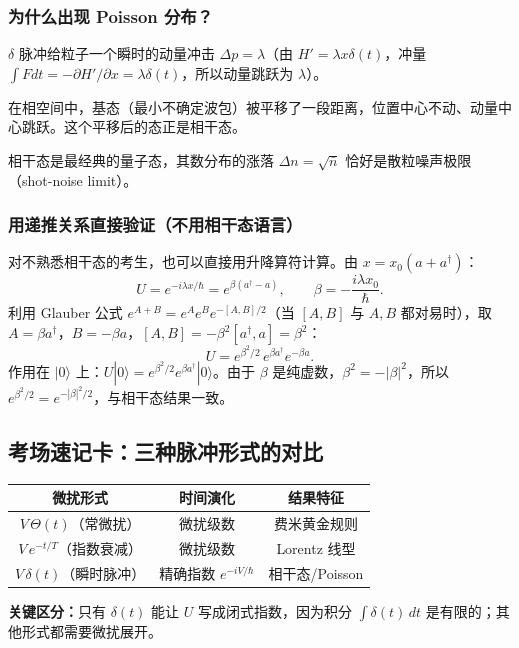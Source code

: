 \subsubsection{为什么出现 Poisson 分布？}

\begin{insightbox}
$\delta$ 脉冲给粒子一个瞬时的动量冲击 $\Delta p = \lambda$（由 $H' = \lambda x\delta(t)$，冲量 $\int F dt = -\partial H'/\partial x = \lambda\delta(t)$，所以动量跳跃为 $\lambda$）。

在相空间中，基态（最小不确定波包）被平移了一段距离，位置中心不动、动量中心跳跃。这个平移后的态正是相干态。

相干态是最经典的量子态，其数分布的涨落 $\Delta n = \sqrt{\bar{n}}$ 恰好是散粒噪声极限（shot-noise limit）。
\end{insightbox}

\subsubsection{用递推关系直接验证（不用相干态语言）}

\begin{derivationbox}[用递推关系直接验证]
对不熟悉相干态的考生，也可以直接用升降算符计算。由 $x = x_0(a + a^\dagger)$：
\[
U = e^{-i\lambda x/\hbar} = e^{\beta(a^\dagger - a)}, \qquad \beta = -\frac{i\lambda x_0}{\hbar}.
\]
利用 Glauber 公式 $e^{A+B} = e^A e^B e^{-[A,B]/2}$（当 $[A,B]$ 与 $A,B$ 都对易时），取 $A = \beta a^\dagger$，$B = -\beta a$，$[A,B] = -\beta^2[a^\dagger, a] = \beta^2$：
\[
U = e^{\beta^2/2} \, e^{\beta a^\dagger} e^{-\beta a}.
\]
作用在 $|0\rangle$ 上：$U|0\rangle = e^{\beta^2/2} e^{\beta a^\dagger} |0\rangle$。由于 $\beta$ 是纯虚数，$\beta^2 = -|\beta|^2$，所以 $e^{\beta^2/2} = e^{-|\beta|^2/2}$，与相干态结果一致。
\end{derivationbox}

\subsection{考场速记卡：三种脉冲形式的对比}

\begin{cheatbox}
\begin{center}
\begin{tabular}{ccc}
\hline
微扰形式 & 时间演化 & 结果特征 \\
\hline
$V\,\Theta(t)$（常微扰） & 微扰级数 & 费米黄金规则 \\
$V\,e^{-t/T}$（指数衰减） & 微扰级数 & Lorentz 线型 \\
$V\,\delta(t)$（瞬时脉冲） & 精确指数 $e^{-iV/\hbar}$ & 相干态/Poisson \\
\hline
\end{tabular}
\end{center}

\textbf{关键区分：}只有 $\delta(t)$ 能让 $U$ 写成闭式指数，因为积分 $\int \delta(t)\,dt$ 是有限的；其他形式都需要微扰展开。
\end{cheatbox}
